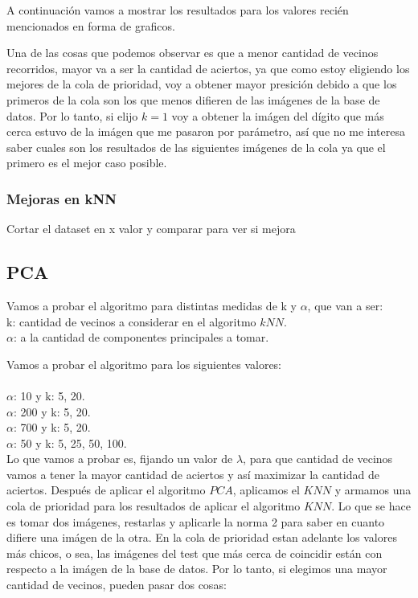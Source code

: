 A continuaci\'on vamos a mostrar los resultados para los valores reci\'en mencionados en forma de graficos.

Una de las cosas que podemos observar es que a menor cantidad de vecinos recorridos, mayor va a ser la cantidad de aciertos, ya que como estoy eligiendo los mejores de la cola de prioridad, voy a obtener mayor presici\'on debido a que los primeros de la cola son los que menos difieren de las im\'agenes de la base de datos.
Por lo tanto, si elijo $k = 1$ voy a obtener la im\'agen del d\'igito que m\'as cerca estuvo de la imágen que me pasaron por parámetro, así que no me interesa saber cuales son los resultados de las siguientes imágenes de la cola ya que el primero es el mejor caso posible.



\subsubsection{Mejoras en kNN}
Cortar el dataset en x valor y comparar para ver si mejora

\subsection{PCA}
Vamos a probar el algoritmo para distintas medidas de k y $\alpha$, que van a ser:\\
k: cantidad de vecinos a considerar en el algoritmo $kNN$.\\
$\alpha$: a la cantidad de componentes principales a tomar.

Vamos a probar el algoritmo para los siguientes valores:\\ \\
$\alpha$: 10  y k: 5, 20.\\
$\alpha$: 200 y k: 5, 20.\\
$\alpha$: 700 y k: 5, 20.\\
$\alpha$: 50  y k: 5, 25, 50, 100.\\

Lo que vamos a probar es, fijando un valor de $\lambda$, para que cantidad de vecinos vamos a tener la mayor cantidad de aciertos y así maximizar la cantidad de aciertos.
Después de aplicar el algoritmo $PCA$, aplicamos el $KNN$ y armamos una cola de prioridad para los resultados de aplicar el algoritmo $KNN$. Lo que se hace es tomar dos imágenes, restarlas y aplicarle la norma 2 para saber en cuanto difiere una imágen de la otra. En la cola de prioridad estan adelante los valores más chicos, o sea, las imágenes del test que más cerca de coincidir están con respecto a la imágen de la base de datos.
Por lo tanto, si elegimos una mayor cantidad de vecinos, pueden pasar dos cosas:

